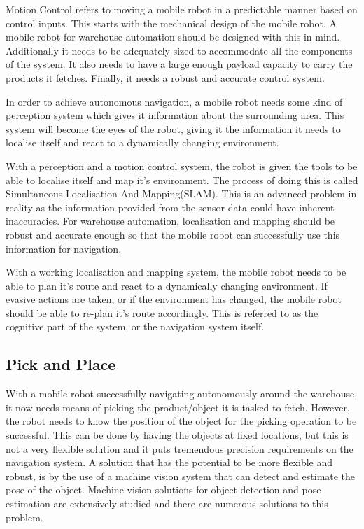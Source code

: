 Motion Control refers to moving a mobile robot in a predictable manner based on control inputs. This starts with the mechanical design of the mobile robot. A mobile robot for warehouse automation should be designed with this in mind. Additionally it needs to be adequately sized  to accommodate all the components of the system.  It also needs to have a large enough payload capacity to carry the products it fetches. Finally, it needs a robust and accurate control system.

In order to achieve autonomous navigation, a mobile robot needs some kind of perception system which gives it information about the surrounding area. This system will become the eyes of the robot, giving it the information it needs to localise itself and react to a dynamically changing environment.

With a perception and a motion control system, the robot is given the tools to be able to localise itself and map it's environment. The process of doing this is called Simultaneous Localisation And Mapping(SLAM). This is an advanced problem in reality as the information provided from the sensor data could have inherent inaccuracies.  For warehouse automation, localisation and mapping should be robust and accurate enough so that the mobile robot can successfully use this information for navigation.

With a working localisation and mapping system, the mobile robot needs to be able to plan it's route and react to a dynamically changing environment. If evasive actions are taken, or if the environment has changed, the mobile robot should be able to re-plan it's route accordingly. This is referred to as the cognitive part of the system, or the navigation system itself.

\subsection{Pick and Place} \label{sec:I:PAP}
With a mobile robot successfully navigating autonomously around the warehouse, it now needs means of picking the product/object it is tasked to fetch. However, the robot needs to know the position of the object for the picking operation to be successful. This can be done by having the objects at fixed locations, but this is not a very flexible solution and it puts tremendous precision requirements on the navigation system. A solution that has the potential to be more flexible and robust, is by the use of a machine vision system that can detect and estimate the pose of the object. Machine vision solutions for object detection and pose estimation are extensively studied and there are numerous solutions to this problem.

